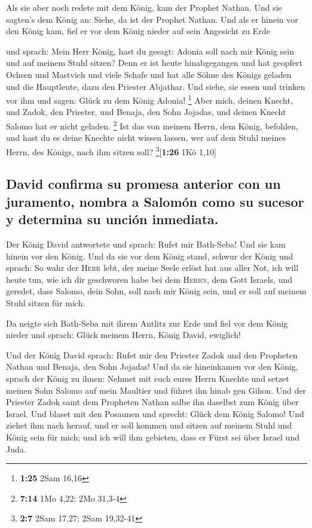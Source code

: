  Als sie aber noch redete mit dem König, kam der Prophet
Nathan.  Und sie sagten's dem König an: Siehe, da ist der
Prophet Nathan. Und als er hinein vor den König kam, fiel er vor dem
König nieder auf sein Angesicht zu Erde

 und sprach: Mein Herr König, hast du gesagt: Adonia soll
nach mir König sein und auf meinem Stuhl sitzen?  Denn er
ist heute hinabgegangen und hat geopfert Ochsen und Mastvieh und viele
Schafe und hat alle Söhne des Königs geladen und die Hauptleute, dazu
den Priester Abjathar. Und siehe, sie essen und trinken vor ihm und
sagen: Glück zu dem König Adonia! \footnote{\textbf{1:25} 2Sam 16,16}
 Aber mich, deinen Knecht, und Zadok, den Priester, und
Benaja, den Sohn Jojadas, und deinen Knecht Salomo hat er nicht geladen.
\footnote{\textbf{7:14} 1Mo 4,22; 2Mo 31,3-4}  Ist das
von meinem Herrn, dem König, befohlen, und hast du es deine Knechte
nicht wissen lassen, wer auf dem Stuhl meines Herrn, des Königs, nach
ihm sitzen soll? \footnote{\textbf{2:7} 2Sam 17,27; 2Sam 19,32-41}{[}\textbf{1:26}
1Kö 1,10{]}

\hypertarget{david-confirma-su-promesa-anterior-con-un-juramento-nombra-a-salomuxf3n-como-su-sucesor-y-determina-su-unciuxf3n-inmediata.}{%
\subsection{David confirma su promesa anterior con un juramento, nombra
a Salomón como su sucesor y determina su unción
inmediata.}\label{david-confirma-su-promesa-anterior-con-un-juramento-nombra-a-salomuxf3n-como-su-sucesor-y-determina-su-unciuxf3n-inmediata.}}

 Der König David antwortete und sprach: Rufet mir
Bath-Seba! Und sie kam hinein vor den König. Und da sie vor dem König
stand,  schwur der König und sprach: So wahr der
\textsc{Herr} lebt, der meine Seele erlöst hat aus aller Not,
 ich will heute tun, wie ich dir geschworen habe bei dem
\textsc{Herrn}, dem Gott Israels, und geredet, dass Salomo, dein Sohn,
soll nach mir König sein, und er soll auf meinem Stuhl sitzen für mich.

 Da neigte sich Bath-Seba mit ihrem Antlitz zur Erde und
fiel vor dem König nieder und sprach: Glück meinem Herrn, König David,
ewiglich!

 Und der König David sprach: Rufet mir den Priester Zadok
und den Propheten Nathan und Benaja, den Sohn Jojadas! Und da sie
hineinkamen vor den König,  sprach der König zu ihnen:
Nehmet mit euch eures Herrn Knechte und setzet meinen Sohn Salomo auf
mein Maultier und führet ihn hinab gen Gihon.  Und der
Priester Zadok samt dem Propheten Nathan salbe ihn daselbst zum König
über Israel. Und blaset mit den Posaunen und sprecht: Glück dem König
Salomo!  Und ziehet ihm nach herauf, und er soll kommen
und sitzen auf meinem Stuhl und König sein für mich; und ich will ihm
gebieten, dass er Fürst sei über Israel und Juda.


